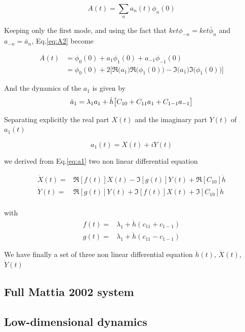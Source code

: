 \documentclass[a4paper,11pt,twoside]{article}
\numberwithin{equation}{section}
\begin{document}
\begin{equation}
\label{eq:A2}
A(t)=\sum_na_n(t)\phi_n(0)
\end{equation}

Keeping only the first mode, and using the fact that $ket{\phi_{-n}}=ket{\bar{\phi}_n}$ and $a_{-n}=\bar{a}_n$,  Eq.\eqref{eq:A2} become

\begin{align}
\label{eq:A3}
A(t)&=\phi_0(0) + a_1\phi_1(0) +a_{-1}\phi_{-1}(0) \nonumber \\
      &=\phi_0(0) + 2\big[\Re\big(a_1\big)\Re\big(\phi_1(0)\big)- \Im\big(a_1\big)\Im\big(\phi_1(0)\big)\big] 
\end{align}


And the dynamics of the $a_1$ is given by
\begin{equation}
\label{eq:a1}
\dot{a}_1=\lambda_1 a_1 + \dot{h}\big[C_{10}+C_{11}a_1+C_{1-1}a_{-1}\big] \nonumber \\
\end{equation}

Separating explicitly the real part $X(t)$ and the imaginary part  $Y(t)$ of $a_1(t)$

 \begin{equation}
 \label{eq:a1xy}
 a_1(t)= X(t) +i Y(t)
 \end{equation}
 
 we derived from Eq.\eqref{eq:a1}  two non linear differential equation

\begin{align}
\dot{X}(t)=&\Re[f(t)]X(t)-\Im[g(t)]Y(t) +\Re[C_{10}]\dot{h}\\
\dot{Y}(t)=&\Re[g(t)]Y(t)+\Im[f(t)]X(t) +\Im[C_{10}]\dot{h}\\
\end{align}

with
\begin{align}
f(t)=&\lambda_1+ \dot{h}(c_{11}+c_{1-1})\\
g(t)=&\lambda_1+ \dot{h}(c_{11}-c_{1-1})
\end{align}


We have finally a set of three non linear differential equation $\dot{h}(t)$, $\dot{X}(t)$, $\dot{Y}(t)$




\subsection{Full Mattia 2002 system}

\subsection{Low-dimensional dynamics}
\end{document}
